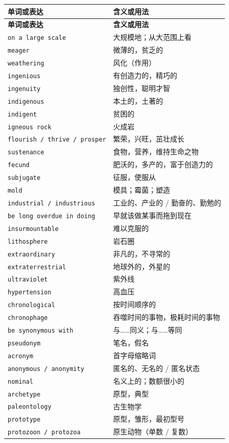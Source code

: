 \documentclass[UTF8,zihao=-4]{ctexart}
\begin{document}
\begin{longtable}{>{\raggedright\arraybackslash}p{4.9cm} >{\raggedright\arraybackslash}p{9.6cm}}
\toprule
\textbf{单词或表达} & \textbf{含义或用法} \\
\midrule
\endfirsthead
\toprule
\textbf{单词或表达} & \textbf{含义或用法} \\
\midrule
\endhead
\texttt{on a large scale} & 大规模地；从大范围上看 \\
\texttt{meager} & 微薄的，贫乏的 \\
\texttt{weathering} & 风化（作用） \\
\texttt{ingenious} & 有创造力的，精巧的 \\
\texttt{ingenuity} & 独创性，聪明才智 \\
\texttt{indigenous} & 本土的，土著的 \\
\texttt{indigent} & 贫困的 \\
\texttt{igneous rock} & 火成岩 \\
\texttt{flourish / thrive / prosper} & 繁荣，兴旺，茁壮成长 \\
\texttt{sustenance} & 食物，营养，维持生命之物 \\
\texttt{fecund} & 肥沃的，多产的，富于创造力的 \\
\texttt{subjugate} & 征服，使服从 \\
\texttt{mold} & 模具；霉菌；塑造 \\
\texttt{industrial / industrious} & 工业的、产业的 / 勤奋的、勤勉的 \\
\texttt{be long overdue in doing} & 早就该做某事而拖到现在 \\
\texttt{insurmountable} & 难以克服的 \\
\texttt{lithosphere} & 岩石圈 \\
\texttt{extraordinary} & 非凡的，不寻常的 \\
\texttt{extraterrestrial} & 地球外的，外星的 \\
\texttt{ultraviolet} & 紫外线 \\
\texttt{hypertension} & 高血压 \\
\texttt{chronological} & 按时间顺序的 \\
\texttt{chronophage} & 吞噬时间的事物，极耗时间的事物 \\
\texttt{be synonymous with} & 与……同义；与……等同 \\
\texttt{pseudonym} & 笔名，假名 \\
\texttt{acronym} & 首字母缩略词 \\
\texttt{anonymous / anonymity} & 匿名的、无名的 / 匿名状态 \\
\texttt{nominal} & 名义上的；数额很小的 \\
\texttt{archetype} & 原型，典型 \\
\texttt{paleontology} & 古生物学 \\
\texttt{prototype} & 原型，雏形，最初型号 \\
\texttt{protozoon / protozoa} & 原生动物（单数 / 复数） \\
\bottomrule
\end{longtable}
\end{document}
